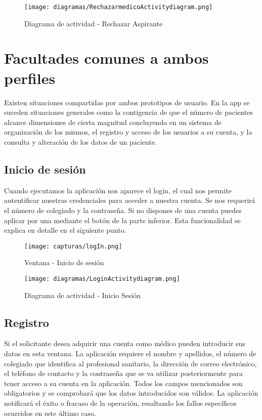 \documentclass[11pt,spanish,
		listoftables,listoffigures]
		{tfgplantilla}
\begin{document}
\begin{figure}[H]
\centering
\texttt{[image: diagramas/RechazarmedicoActivitydiagram.png]}
\caption{Diagrama de actividad -  Rechazar Aspirante}
\end{figure}

\section {Facultades comunes a ambos perfiles}

Existen situaciones compartidas por ambos prototipos de usuario. En la app se suceden situaciones generales como la contigencia de que el número de pacientes alcance dimensiones de cierta magnitud concluyendo en un sistema de organización de los mismos, el registro y acceso de los usuarios a su cuenta, y la consulta y alteración de los datos de un paciente.

\subsection {Inicio de sesión}

Cuando ejecutamos la aplicación nos aparece el login, el cual nos permite autentificar nuestras credenciales para acceder a nuestra cuenta. Se nos requerirá el número de colegiado y la contraseña.
Si no dispones de una cuenta puedes aplicar por una mediante el botón de la parte inferior. Esta funcionalidad se explica en detalle en el siguiente punto.

\begin{figure}[H]
\centering
\texttt{[image: capturas/logIn.png]}
\caption{Ventana - Inicio de sesión}
\end{figure}

\begin{figure}[H]
\centering
\texttt{[image: diagramas/LoginActivitydiagram.png]}
\caption{Diagrama de actividad - Inicio Sesión}
\end{figure}

\subsection {Registro}

Si el solicitante desea adquirir una cuenta como médico pueden introducir sus datos en esta ventana. La aplicación requiere el nombre y apellidos, el número de colegiado que identifica al profesional sanitario, la dirección de correo electrónico, el teléfono de contacto y la contraseña que se va utilizar posteriormente para tener acceso a su cuenta en la aplicación. Todos los campos mencionados son obligatorios y se comprobará que los datos introducidos son válidos.
La aplicación notificará el éxito o fracaso de la operación, resaltando los fallos específicos ocurridos en este último caso.
\end{document}
